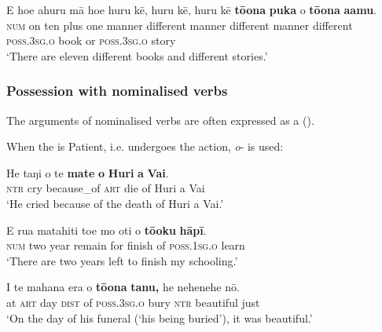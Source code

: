 \ea\label{ex:6.100}
\gll E ho{\ꞌ}e {\ꞌ}ahuru mā ho{\ꞌ}e huru kē, huru kē, huru kē  \textbf{tō{\ꞌ}ona} \textbf{puka} {\ꞌ}o \textbf{tō{\ꞌ}ona} \textbf{{\ꞌ}a{\ꞌ}amu}.\\
\textsc{num} on ten plus one manner different manner different manner different  \textsc{poss.3sg.o} book or \textsc{poss.3sg.o} story\\

\glt 
‘There are eleven different books and different stories.’ \textstyleExampleref{[R206.019]} 
\z

\subsubsection[Possession with nominalised verbs]{Possession with nominalised verbs}\label{sec:6.3.3.4}

The arguments of nominalised verbs are often expressed as a  (). 

When the  is Patient, i.e. undergoes the action, \textit{o}{}- is used:

\ea\label{ex:6.101}
\gll He taŋi {\ꞌ}o te \textbf{mate} \textbf{o} \textbf{Huri} \textbf{{\ꞌ}a} \textbf{Vai}. \\
\textsc{ntr} cry because\_of \textsc{art} die of Huri a Vai \\

\glt 
‘He cried because of the death of Huri a Vai.’ \textstyleExampleref{[R304.104]} 
\z

\ea\label{ex:6.102}
\gll E rua matahiti toe mo oti o \textbf{tō{\ꞌ}oku} \textbf{hāpī}. \\
\textsc{num} two year remain for finish of \textsc{poss.1sg.o} learn \\

\glt 
‘There are two years left to finish my schooling.’ \textstyleExampleref{[R399.070]} 
\z

\ea\label{ex:6.103}
\gll {\ꞌ}I te mahana era o \textbf{tō{\ꞌ}ona} \textbf{tanu,} he nehenehe nō.\\
at \textsc{art} day \textsc{dist} of \textsc{poss.3sg.o} bury \textsc{ntr} beautiful just\\

\glt 
‘On the day of his funeral (‘his being buried’), it was beautiful.’ \textstyleExampleref{[R309.140]} 
\z

